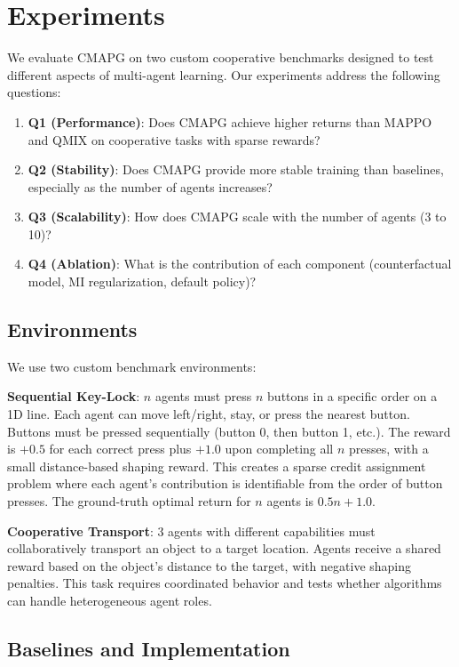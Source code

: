 \documentclass[journal]{IEEEtran}
\begin{document}
\section{Experiments}
\label{sec:experiments}

We evaluate CMAPG on two custom cooperative benchmarks designed to test different aspects of multi-agent learning. Our experiments address the following questions:

\begin{enumerate}
    \item \textbf{Q1 (Performance)}: Does CMAPG achieve higher returns than MAPPO and QMIX on cooperative tasks with sparse rewards?
    \item \textbf{Q2 (Stability)}: Does CMAPG provide more stable training than baselines, especially as the number of agents increases?
    \item \textbf{Q3 (Scalability)}: How does CMAPG scale with the number of agents (3 to 10)?
    \item \textbf{Q4 (Ablation)}: What is the contribution of each component (counterfactual model, MI regularization, default policy)?
\end{enumerate}

\subsection{Environments}

We use two custom benchmark environments:

\textbf{Sequential Key-Lock}: $n$ agents must press $n$ buttons in a specific order on a 1D line. Each agent can move left/right, stay, or press the nearest button. Buttons must be pressed sequentially (button 0, then button 1, etc.). The reward is $+0.5$ for each correct press plus $+1.0$ upon completing all $n$ presses, with a small distance-based shaping reward. This creates a sparse credit assignment problem where each agent's contribution is identifiable from the order of button presses. The ground-truth optimal return for $n$ agents is $0.5n + 1.0$.

\textbf{Cooperative Transport}: 3 agents with different capabilities must collaboratively transport an object to a target location. Agents receive a shared reward based on the object's distance to the target, with negative shaping penalties. This task requires coordinated behavior and tests whether algorithms can handle heterogeneous agent roles.

\subsection{Baselines and Implementation}
\end{document}
